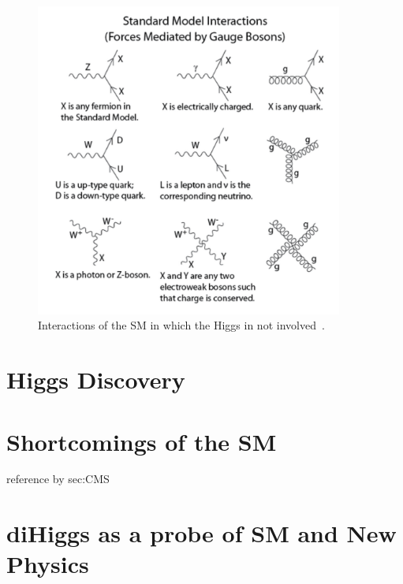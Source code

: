 \begin{figure}[ht]
 \begin{center}
    \includegraphics[width=0.90\textwidth]{figures/intro/Standard_Model_Feynman_Diagram_Vertices.pdf}
      \end{center}
\caption{Interactions of the SM in which the Higgs in not involved~\cite{SMinteractions_nonhiggs}.}
\label{fig:nonhiggsint}
\end{figure}

\section{Higgs Discovery\label{sec:discovery}}




\section{Shortcomings of the SM\label{sec:SMshortcomings}}
reference by sec:CMS


\section{diHiggs as a probe of SM and New Physics\label{sec:diHiggs}}


